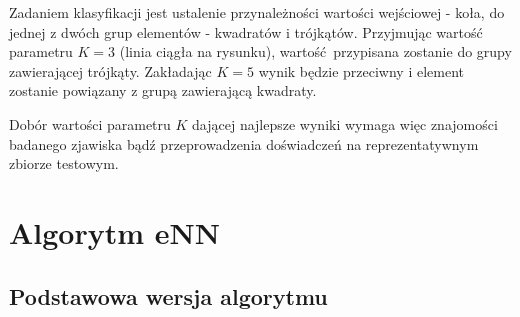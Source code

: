 \documentclass[12pt]{report}
\begin{document}
Zadaniem klasyfikacji jest ustalenie przynależności wartości wejściowej - koła, do jednej z dwóch grup elementów - kwadratów i trójkątów. Przyjmując wartość parametru $K=3$ (linia ciągła na rysunku), wartość przypisana zostanie do grupy zawierającej trójkąty. Zakładając $K=5$ wynik będzie przeciwny i element zostanie powiązany z grupą zawierającą kwadraty.

Dobór wartości parametru $K$ dającej najlepsze wyniki wymaga więc znajomości badanego zjawiska bądź przeprowadzenia doświadczeń na reprezentatywnym zbiorze testowym.

\chapter{Algorytm eNN}
\label{chap:enn}
\section{Podstawowa wersja algorytmu}
\end{document}
